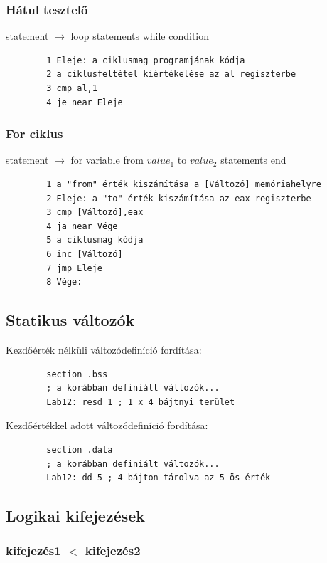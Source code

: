 \documentclass[margin=0px]{article}
\begin{document}
\subsubsection{Hátul tesztelő}
statement $ \rightarrow $ loop statements while condition


\begin{verbatim}
		1 Eleje: a ciklusmag programjának kódja
		2 a ciklusfeltétel kiértékelése az al regiszterbe
		3 cmp al,1
		4 je near Eleje
	\end{verbatim}

\subsubsection{For ciklus}

statement $ \rightarrow $ for variable from $ value_1 $ to $ value_2 $ statements end


\begin{verbatim}
		1 a "from" érték kiszámítása a [Változó] memóriahelyre
		2 Eleje: a "to" érték kiszámítása az eax regiszterbe
		3 cmp [Változó],eax
		4 ja near Vége
		5 a ciklusmag kódja
		6 inc [Változó]
		7 jmp Eleje
		8 Vége:
	\end{verbatim}

\subsection{Statikus változók}

Kezdőérték nélküli változódefiníció fordítása:
\begin{verbatim}
		section .bss
		; a korábban definiált változók...
		Lab12: resd 1 ; 1 x 4 bájtnyi terület
	\end{verbatim}


Kezdőértékkel adott változódefiníció fordítása:
\begin{verbatim}
		section .data
		; a korábban definiált változók...
		Lab12: dd 5 ; 4 bájton tárolva az 5-ös érték
	\end{verbatim}

\subsection{Logikai kifejezések}

\subsubsection{kifejezés1 $ < $  kifejezés2 }
\end{document}
